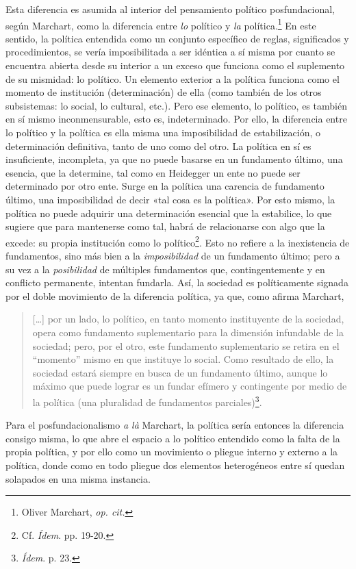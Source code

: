 Esta diferencia es asumida al interior del pensamiento político posfundacional, según Marchart, como la diferencia entre \emph{lo} político y \emph{la} política.\footnote{Oliver Marchart, \emph{op. cit.}} En este sentido, la política entendida como un conjunto específico de reglas, significados y procedimientos, se vería imposibilitada a ser idéntica a sí misma por cuanto se encuentra abierta desde su interior a un exceso que funciona como el suplemento de su mismidad: lo político. Un elemento exterior a la política funciona como el momento de institución (determinación) de ella (como también de los otros subsistemas: lo social, lo cultural, etc.). Pero ese elemento, lo político, es también en sí mismo inconmensurable, esto es, indeterminado. Por ello, la diferencia entre lo político y la política es ella misma una imposibilidad de estabilización, o determinación definitiva, tanto de uno como del otro. La política en sí es insuficiente, incompleta, ya que no puede basarse en un fundamento último, una esencia, que la determine, tal como en Heidegger un ente no puede ser determinado por otro ente. Surge en la política una carencia de fundamento último, una imposibilidad de decir «tal cosa es la política». Por esto mismo, la política no puede adquirir una determinación esencial que la estabilice, lo que sugiere que para mantenerse como tal, habrá de relacionarse con algo que la excede: su propia institución como lo político\footnote{Cf. \emph{Ídem}. pp. 19-20.}. Esto no refiere a la inexistencia de fundamentos, sino más bien a la \emph{imposibilidad} de un fundamento último; pero a su vez a la \emph{posibilidad} de múltiples fundamentos que, contingentemente y en conflicto permanente, intentan fundarla. Así, la sociedad es políticamente signada por el doble movimiento de la diferencia política, ya que, como afirma Marchart,

\begin{quote}
{[}\ldots{]} por un lado, lo político, en tanto momento instituyente de la sociedad, opera como fundamento suplementario para la dimensión infundable de la sociedad; pero, por el otro, este fundamento suplementario se retira en el ``momento'' mismo en que instituye lo social. Como resultado de ello, la sociedad estará siempre en busca de un fundamento último, aunque lo máximo que puede lograr es un fundar efímero y contingente por medio de la política (una pluralidad de fundamentos parciales)\footnote{\emph{Ídem}. p. 23.}.
\end{quote}

Para el posfundacionalismo \emph{a là} Marchart, la política sería entonces la diferencia consigo misma, lo que abre el espacio a lo político entendido como la falta de la propia política, y por ello como un movimiento o pliegue interno y externo a la política, donde como en todo pliegue dos elementos heterogéneos entre sí quedan solapados en una misma instancia.

